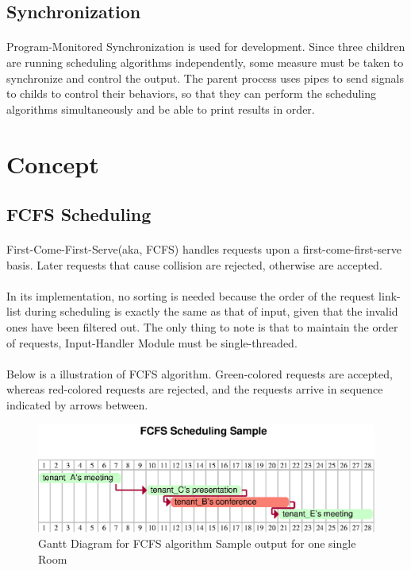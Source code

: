 \documentclass{article}
\begin{document}
        \subsection{Synchronization}
            \paragraph{}
            Program-Monitored Synchronization is used for development. Since three children are running scheduling algorithms independently, some measure must be taken to synchronize and control the output. The parent process uses pipes to send signals to childs to control their behaviors, so that they can perform the scheduling algorithms simultaneously and be able to print results in order.
    \cleardoublepage
    \section{Concept}
        \subsection{FCFS Scheduling}
            \paragraph{}
                First-Come-First-Serve(aka, FCFS) handles requests upon a first-come-first-serve basis. Later requests that cause collision are rejected, otherwise are accepted.
            \paragraph{}
                In its implementation, no sorting is needed because the order of the request link-list during scheduling is exactly the same as that of input, given that the invalid ones have been filtered out. The only thing to note is that to maintain the order of requests, Input-Handler Module must be single-threaded.
            \paragraph{}
                Below is a illustration of FCFS algorithm. Green-colored requests are accepted, whereas red-colored requests are rejected, and the requests arrive in sequence indicated by arrows between. 
            \begin{figure}[!htbp]
                \centering
                \includegraphics[scale=0.7]{eps/fcfs_scheduling.eps}
                \caption{Gantt Diagram for FCFS algorithm Sample output for one single Room}
            \end{figure}
\end{document}
